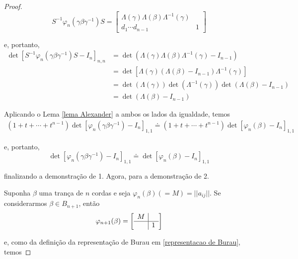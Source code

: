 \begin{proof}
\begin{equation*}
		S^{-1}\varphi_n(\gamma\beta\gamma^{-1})S = \left[\begin{array}{c|c}
		\Lambda(\gamma)\Lambda(\beta)\Lambda^{-1}(\gamma) & \\
		\hline 
		d_1\cdots d_{n-1} & 1
		\end{array}\right]
		\end{equation*}
		\par\vspace{0.3cm} e, portanto, 
		\begin{align*}
		\det[S^{-1}\varphi_n(\gamma\beta\gamma^{-1})S - I_n]_{n,n} &= \det(\Lambda(\gamma)\Lambda(\beta)\Lambda^{-1}(\gamma) - I_{n-1}) \\ 
		&= \det[\Lambda(\gamma)(\Lambda(\beta) - I_{n-1})\Lambda^{-1}(\gamma)] \\
		&= \det(\Lambda(\gamma))\det(\Lambda^{-1}(\gamma))\det(\Lambda(\beta) - I_{n-1}) \\
		&= \det(\Lambda(\beta) - I_{n-1})
		\end{align*}
		\par\vspace{0.3cm} Aplicando o Lema \eqref{lema Alexander} a ambos os lados da igualdade, temos
		\begin{align*}
		(1 + t + \cdots + t^{n-1})\det[\varphi_n(\gamma\beta\gamma^{-1}) - I_n]_{1,1}\doteq(1+t+\cdots+t^{n-1})\det[\varphi_n(\beta) - I_n]_{1,1}
		\end{align*}
		\par\vspace{0.3cm} e, portanto, 
		\begin{equation*}
		\det[\varphi_n(\gamma\beta\gamma^{-1}) - I_n]_{1,1}\doteq\det[\varphi_n(\beta) - I_n]_{1,1}
		\end{equation*}
		\par\vspace{0.3cm} finalizando a demonstração de 1. Agora, para a demonstração de 2.
		\par\vspace{0.3cm} Suponha $\beta$ uma trança de $n$ cordas e seja $\varphi_n(\beta)(=M) = ||a_{ij}||$. Se considerarmos $\beta\in B_{n+1}$, então
		\begin{equation*}
		\varphi_{n+1}(\beta) = \left[\begin{array}{c|c}
		M & \\
		\hline
		& 1
		\end{array}\right]
		\end{equation*}
		\par\vspace{0.3cm} e, como da definição da representação de Burau em \eqref{representacao de Burau}, temos

\end{proof}

